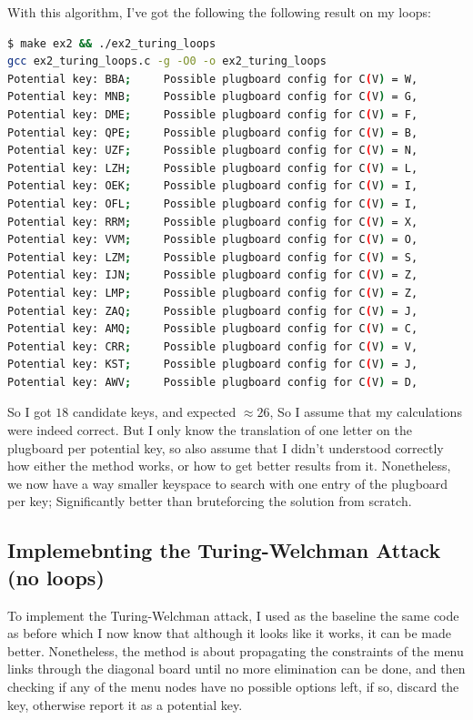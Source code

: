 \documentclass{article}
\begin{document}
With this algorithm, I've got the following the following result on my loops:

\begin{lstlisting}[language=bash]
$ make ex2 && ./ex2_turing_loops
gcc ex2_turing_loops.c -g -O0 -o ex2_turing_loops
Potential key: BBA;     Possible plugboard config for C(V) = W, 
Potential key: MNB;     Possible plugboard config for C(V) = G, 
Potential key: DME;     Possible plugboard config for C(V) = F, 
Potential key: QPE;     Possible plugboard config for C(V) = B, 
Potential key: UZF;     Possible plugboard config for C(V) = N, 
Potential key: LZH;     Possible plugboard config for C(V) = L, 
Potential key: OEK;     Possible plugboard config for C(V) = I, 
Potential key: OFL;     Possible plugboard config for C(V) = I, 
Potential key: RRM;     Possible plugboard config for C(V) = X, 
Potential key: VVM;     Possible plugboard config for C(V) = O, 
Potential key: LZM;     Possible plugboard config for C(V) = S, 
Potential key: IJN;     Possible plugboard config for C(V) = Z, 
Potential key: LMP;     Possible plugboard config for C(V) = Z, 
Potential key: ZAQ;     Possible plugboard config for C(V) = J, 
Potential key: AMQ;     Possible plugboard config for C(V) = C, 
Potential key: CRR;     Possible plugboard config for C(V) = V, 
Potential key: KST;     Possible plugboard config for C(V) = J, 
Potential key: AWV;     Possible plugboard config for C(V) = D, 
\end{lstlisting}

So I got $18$ candidate keys, and expected $\approx 26$, So I assume that my calculations were indeed correct.
But I only know the translation of one letter on the plugboard per potential key, so also assume that I didn't understood correctly how either the method works, or how to get better results from it.
Nonetheless, we now have a way smaller keyspace to search with one entry of the plugboard per key; Significantly better than bruteforcing the solution from scratch.

\subsection{Implemebnting the Turing-Welchman Attack (no loops)}
To implement the Turing-Welchman attack, I used as the baseline the same code as before which I now know that although it looks like it works, it can be made better.
Nonetheless, the method is about propagating the constraints of the menu links through the diagonal board until no more elimination can be done, and then checking if any of the menu nodes have no possible options left, if so, discard the key, otherwise report it as a potential key.
\end{document}
